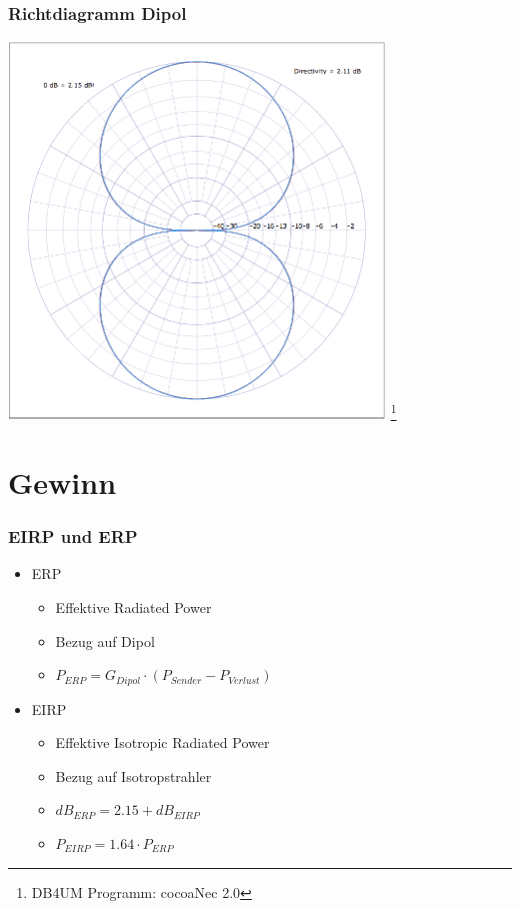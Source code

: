 \begin{frame}
    \frametitle{Richtdiagramm Dipol}
    \begin{center}
        \includegraphics[width=0.75\textwidth]{e11/Richt-Dipol.png}
        \footnote{\tiny DB4UM Programm: cocoaNec 2.0}
	\end{center}
\end{frame}

\section*{Gewinn}

\begin{frame}
    \frametitle{EIRP und ERP}
    \begin{itemize}
    	\item ERP
		    \begin{itemize}
				\item Effektive Radiated Power
       		 	\item Bezug auf Dipol
       		 	\item $P_{ERP} = G_{Dipol} \cdot (P_{Sender} - P_{Verlust})$
 		   	\end{itemize}
		\item EIRP
		    \begin{itemize}
				\item Effektive Isotropic Radiated Power
       		 	\item Bezug auf Isotropstrahler
       		 	\item $dB_{ERP} = 2.15 + dB_{EIRP}$
       		 	\item $P_{EIRP} = 1.64 \cdot P_{ERP}$
 		   	\end{itemize}
    \end{itemize}
\end{frame}

